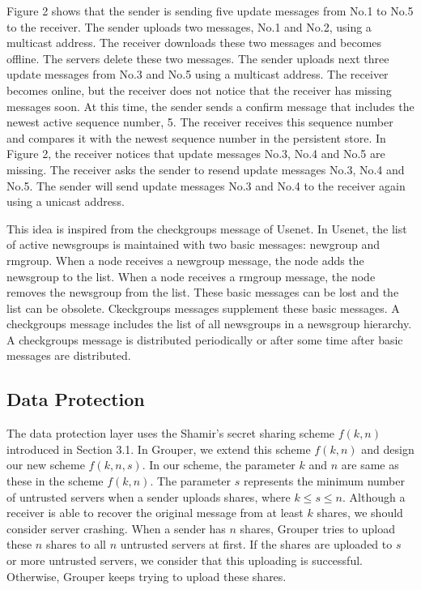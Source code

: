 \documentclass[twocolumn,10pt]{article}
\begin{document}
Figure 2 shows that the sender is sending five update messages from No.1 to No.5 to the receiver.
The sender uploads two messages, No.1 and No.2,  using a multicast address.
The receiver downloads these two messages and becomes offline.
The servers delete these two messages.
The sender uploads next three update messages from No.3 and No.5  using a multicast address.
The receiver becomes online, but the receiver does not notice that the receiver has missing messages soon.
At this time, the sender sends a confirm message that includes the newest active sequence number, 5.
The receiver receives this sequence number and compares it with the newest sequence number in the persistent store.
In Figure 2, the receiver notices that update messages No.3, No.4 and No.5 are missing.
The receiver asks the sender to resend update messages No.3, No.4 and No.5.
The sender will send update messages No.3 and No.4 to the receiver again using a unicast address.

This idea is inspired from the checkgroups message of Usenet\cite{usenet}.
In Usenet, the list of active newsgroups is maintained with two basic messages: newgroup and rmgroup.
When a node receives a newgroup message, the node adds the newsgroup to the list.
When a node receives a rmgroup message, the node removes the newsgroup from the list.
These basic messages can be lost and the list can be obsolete.
Ckeckgroups messages supplement these basic messages.
A checkgroups message includes the list of all newsgroups in a newsgroup hierarchy.
A checkgroups message is distributed periodically or after some time after basic messages are distributed.

\subsection{Data Protection}

The data protection layer uses the Shamir's secret sharing scheme $f(k, n)$ introduced in Section 3.1.
In Grouper, we extend this scheme $f(k, n)$ and design our new scheme $ f(k, n, s)$.
In our scheme, the parameter $k$ and $n$ are same as these in the scheme $f(k, n)$. 
The  parameter $s$ represents the minimum number of untrusted servers when a sender uploads shares, where $k \leq s \leq n$.
Although a receiver is able to recover the original message from at least $k$ shares, we should consider server crashing. 
When a sender has $n$ shares, Grouper tries to upload these $n$ shares to all $n$ untrusted servers at first. 
If the shares are uploaded to $s$ or more untrusted servers, we consider that this uploading is successful.
Otherwise, Grouper keeps trying to upload these shares.
\end{document}
